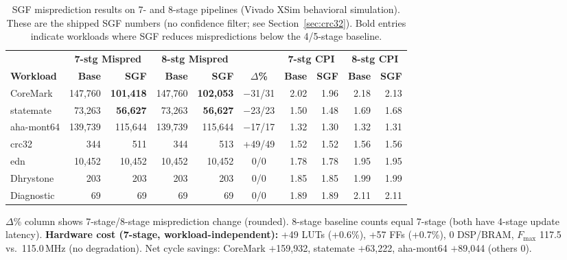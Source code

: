 \documentclass[acmsmall,nonacm,screen]{acmart}
\begin{document}
\begin{table}[t]
\centering
\caption{SGF misprediction results on 7- and 8-stage pipelines (Vivado XSim behavioral simulation). These are the shipped SGF numbers (no confidence filter; see Section~\ref{sec:crc32}). Bold entries indicate workloads where SGF reduces mispredictions below the 4/5-stage baseline.}
\label{tab:sgf_mispred}
\small
\begin{tabular}{@{}l rr rr c rr rr@{}}
\toprule
& \multicolumn{2}{c}{\textbf{7-stg Mispred}} & \multicolumn{2}{c}{\textbf{8-stg Mispred}} & & \multicolumn{2}{c}{\textbf{7-stg CPI}} & \multicolumn{2}{c}{\textbf{8-stg CPI}} \\
\cmidrule{2-3} \cmidrule{4-5} \cmidrule{7-8} \cmidrule{9-10}
\textbf{Workload} & \textbf{Base} & \textbf{SGF} & \textbf{Base} & \textbf{SGF} & \textbf{$\Delta$\%} & \textbf{Base} & \textbf{SGF} & \textbf{Base} & \textbf{SGF} \\
\midrule
CoreMark     & 147{,}760 & \textbf{101{,}418} & 147{,}760 & \textbf{102{,}053} & $-$31/31 & 2.02 & 1.96 & 2.18 & 2.13 \\
statemate    & 73{,}263  & \textbf{56{,}627}  & 73{,}263  & \textbf{56{,}627}  & $-$23/23 & 1.50 & 1.48 & 1.69 & 1.68 \\
aha-mont64   & 139{,}739 & 115{,}644          & 139{,}739 & 115{,}644          & $-$17/17 & 1.32 & 1.30 & 1.32 & 1.31 \\
crc32        & 344       & 511                & 344       & 513                & +49/49   & 1.52 & 1.52 & 1.56 & 1.56 \\
edn          & 10{,}452  & 10{,}452           & 10{,}452  & 10{,}452           & 0/0      & 1.78 & 1.78 & 1.95 & 1.95 \\
Dhrystone    & 203       & 203                & 203       & 203                & 0/0      & 1.85 & 1.85 & 1.99 & 1.99 \\
Diagnostic   & 69        & 69                 & 69        & 69                 & 0/0      & 1.89 & 1.89 & 2.11 & 2.11 \\
\bottomrule
\end{tabular}

\vspace{2.5mm}
{\footnotesize $\Delta$\% column shows 7-stage/8-stage misprediction change (rounded). 8-stage baseline counts equal 7-stage (both have 4-stage update latency). \textbf{Hardware cost (7-stage, workload-independent):} +49 LUTs (+0.6\%), +57 FFs (+0.7\%), 0 DSP/BRAM, $F_{\max}$ 117.5 vs.\ 115.0\,MHz (no degradation). Net cycle savings: CoreMark $+$159{,}932, statemate $+$63{,}222, aha-mont64 $+$89{,}044 (others 0).}
\end{table}
\end{document}

